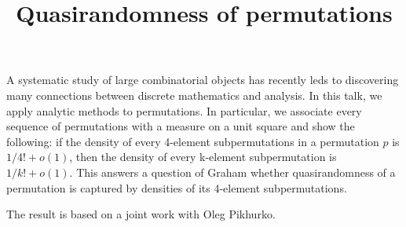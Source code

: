 \title{Quasirandomness of permutations}
\endtitle

A systematic study of large combinatorial objects has recently leds
to discovering many connections between discrete mathematics and
analysis. In this talk, we apply analytic methods to permutations.
In particular, we associate every sequence of permutations
with a measure on a unit square and show the following:
if the density of every 4-element subpermutations in a permutation $p$
is $1/4!+o(1)$, then the density of every k-element subpermutation
is $1/k!+o(1)$. This answers a question of Graham whether quasirandomness
of a permutation is captured by densities of its 4-element subpermutations.

The result is based on a joint work with Oleg Pikhurko.

